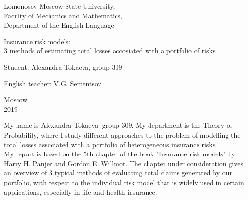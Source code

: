 \documentclass[12pt]{article}
\begin{document}
\begin{titlepage}

 \begin{center}
 Lomonosov Moscow State University, \\
 Faculty of Mechanics and Mathematics,\\
 Department of the English Language
  \end{center}

 \vspace{3cm}
 
 \begin{center}
   
  {  Insurance risk models:\\
   3 methods of estimating total losses accosiated with  a portfolio of risks.}
   
    \vspace{5cm}
\end{center}     
   
     
   \hspace{170pt}  {Student: Alexandra Tokaeva, group 309\\}
       
 \vspace{0.1cm}
  \hspace{170pt} 	  English teacher:  V.G. Sementsov\\

\vspace{4cm}

  \begin{center}
  {Moscow\\
  2019}
  \end{center}  
  
  
\end{titlepage}


My name is Alexandra Tokaeva, group 309. My department is the Theory of Probability, where I study different approaches to the problem of modelling  the total losses associated  with a portfolio of heterogeneous insurance risks. \\

 My report is based on the 5th chapter of the book "Insurance risk models" by Harry H. Panjer and Gordon E. Willmot.
 The chapter under consideration gives an overview of 3 typical methods of evaluating total claims generated by our  portfolio,  with respect to  the individual risk model that is widely used in certain applications, especially in life and health insurance.\\
 
\end{document}
